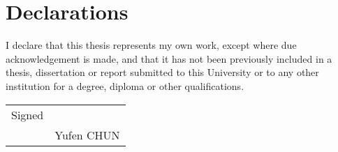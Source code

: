 

%
%


\chapter*{Declarations}

I declare that this thesis represents my own work, except where due acknowledgement is made, and that it has not been previously included in a thesis, dissertation or report submitted to this University or to any other institution for a degree, diploma or other qualifications.%

\bigskip
\bigskip
\bigskip
\bigskip
\bigskip
\bigskip
\bigskip
\bigskip

\begin{flushright}
    \begin{tabular}{p{1cm} p{4cm}}
        Signed & \dotfill \\
           & \center Yufen CHUN\\
    \end{tabular}
\end{flushright}

\bigskip
\bigskip
\bigskip
